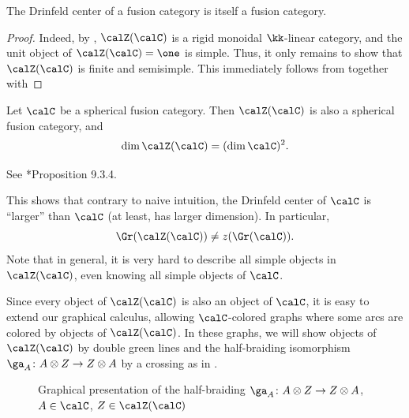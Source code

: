 \begin{theorem}\label{t:drinfeld-fusion}
  The Drinfeld center of a fusion category is itself a fusion category.
\end{theorem}
\begin{proof}
  Indeed, by , $\calZ(\calC)$ is a rigid monoidal
  $\kk$-linear  category, and the  unit object of $\calZ(\calC)=\one$ is
  simple. Thus, it only remains to show that $\calZ(\calC)$ is finite and
  semisimple. This  immediately follows from  together
  with 
\end{proof}

\begin{theorem}\label{t:drinfeld-dim}
  Let $\calC$ be a spherical fusion category. Then $\calZ(\calC)$ is also a
  spherical fusion category, and
  $$
    \dim \calZ(\calC) = (\dim \calC)^2.
  $$
\end{theorem}
See *{Proposition 9.3.4}.
\begin{remark}\label{r:drinfeld-size}
  This shows that contrary to naive intuition, the Drinfeld center  of $\calC$
  is ``larger'' than $\calC$ (at least, has larger dimension). In particular,
  $$
  \Gr(\calZ(\calC))\ne z(\Gr(\calC)).
  $$
   Note that in general, it is very hard to describe all simple objects in
   $\calZ(\calC)$, even knowing all simple objects of $\calC$.
\end{remark}

Since every object of $\calZ(\calC)$ is also an object of $\calC$, it is easy
to extend our graphical calculus, allowing $\calC$-colored graphs where some
arcs are colored by objects of $\calZ(\calC)$. In these graphs, we
will show objects of $\calZ(\calC)$ by double green lines and the
half-braiding isomorphism $\ga_A\colon A\otimes Z\to Z\otimes A$ by a
crossing as in .
\begin{figure}[ht]

  \caption{Graphical presentation of the half-braiding
    $\ga_A\colon A\otimes Z\to Z\otimes A$,
    $A\in \calC$, $Z\in \calZ(\calC)$ }\label{f:crossing}
\end{figure}


